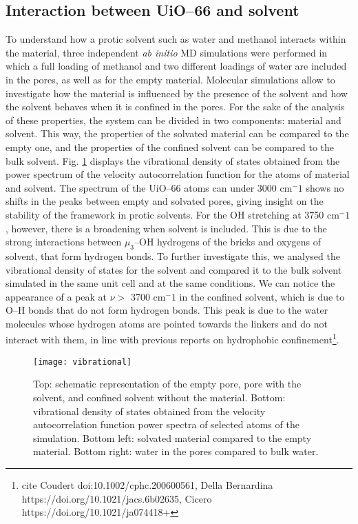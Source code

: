 \subsection{Interaction between UiO--66 and solvent}
To understand how a protic solvent such as water and methanol interacts within the material, three independent \textit{ab initio} MD simulations were performed in which a full loading of methanol and two different loadings of water are included in the pores, as well as for the empty material. Molecular simulations allow to investigate how the material is influenced by the presence of the solvent and how the solvent behaves when it is confined in the pores. For the sake of the analysis of these properties, the system can be divided in two components: material and solvent. This way, the properties of the solvated material can be compared to the empty one, and the properties of the confined solvent can be compared to the bulk solvent. Fig. \ref{fig:vibrational} displays the vibrational density of states obtained from the power spectrum of the velocity autocorrelation function for the atoms of material and solvent. The spectrum of the UiO--66 atoms can under 3000 cm$^-1$ shows no shifts in the peaks between empty and solvated pores, giving insight on the stability of the framework in protic solvents. For the OH stretching at 3750 cm$^-1$, however, there is a broadening when solvent is included. This is due to the strong interactions between $\mu_3$--OH hydrogens of the bricks and oxygens of solvent, that form hydrogen bonds. To further investigate this, we analysed the vibrational density of states for the solvent and compared it to the bulk solvent simulated in the same unit cell and at the same conditions. We can notice the appearance of a peak at $\nu >$ 3700 cm$^-1$ in the confined solvent, which is due to O--H bonds that do not form hydrogen bonds. This peak is due to the water molecules whose hydrogen atoms are pointed towards the linkers and do not interact with them, in line with previous reports on hydrophobic confinement\footnote{cite Coudert doi:10.1002/cphc.200600561, Della Bernardina https://doi.org/10.1021/jacs.6b02635, Cicero https://doi.org/10.1021/ja074418+}. 

\begin{figure}[!htbp]
	\centering
	\texttt{[image: vibrational]}
	\caption{Top: schematic representation of the empty pore, pore with the solvent, and confined solvent without the material. Bottom: vibrational density of states obtained from the velocity autocorrelation function power spectra of selected atoms of the simulation. Bottom left: solvated material compared to the empty material. Bottom right: water in the pores compared to bulk water.}
	\label{fig:vibrational}
\end{figure}

